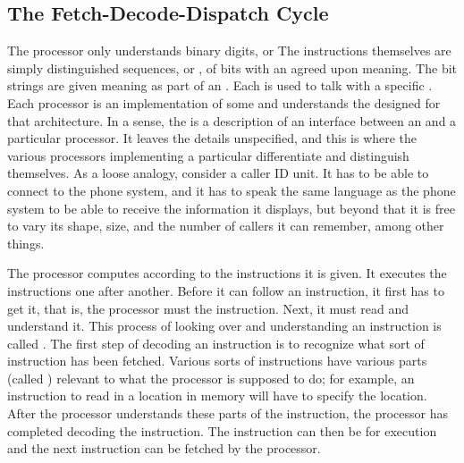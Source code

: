 \subsection{The Fetch-Decode-Dispatch Cycle}
The processor only understands binary digits, or  The instructions themselves are simply distinguished sequences, or , of bits with an agreed upon meaning. The bit strings are given meaning as part of an . Each \ISL is used to talk with a specific . Each processor is an implementation of some \ISA and understands the \ISL designed for that architecture. In a sense, the \ISA is a description of an interface between an \ISL and a particular processor. It leaves the details unspecified, and this is where the various processors implementing a particular \ISA differentiate and distinguish themselves. As a loose analogy, consider a caller ID unit. It has to be able to connect to the phone system, and it has to speak the same language as the phone system to be able to receive the information it displays, but beyond that it is free to vary its shape, size, and the number of callers it can remember, among other things.

The processor computes according to the instructions it is given. It executes the instructions one after another. Before it can follow an instruction, it first has to get it, that is, the processor must  the instruction. Next, it must read and understand it. This process of looking over and understanding an instruction is called . The first step of decoding an instruction is to recognize what sort of instruction has been fetched. Various sorts of instructions have various parts (called ) relevant to what the processor is supposed to do; for example, an instruction to read in a location in memory will have to specify the location. After the processor understands these parts of the instruction, the processor has completed decoding the instruction. The instruction can then be  for execution and the next instruction can be fetched by the processor.%

